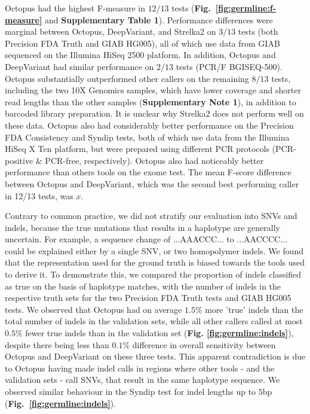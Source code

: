 \documentclass[notitlepage, twocolumn, 10pt]{article}
\begin{document}
Octopus had the highest F-measure in $12/13$ tests (\textbf{Fig.\ \ref{fig:germline:f-measure}} and \textbf{Supplementary Table 1}). Performance differences were marginal between Octopus, DeepVariant, and Strelka2 on $3/13$ tests (both Precision FDA Truth and GIAB HG005), all of which use data from GIAB sequenced on the Illumina HiSeq 2500 platform. In addition, Octopus and DeepVariant had similar performance on $2/13$ tests (PCR/F BGISEQ-500). Octopus substantially outperformed other callers on the remaining $8/13$ tests, including the two 10X Genomics samples, which have lower coverage and shorter read lengths than the other samples (\textbf{Supplementary Note 1}), in addition to barcoded library preparation. It is unclear why Strelka2 does not perform well on these data. Octopus also had considerably better performance on the Precision FDA Consistency and Syndip tests, both of which use data from the Illumina HiSeq X Ten platform, but were prepared using different PCR protocols (PCR-positive \& PCR-free, respectively). Octopus also had noticeably better performance than others tools on the exome test. The mean F-score difference between Octopus and DeepVariant, which was the second best performing caller in 12/13 tests, was $x$.

Contrary to common practice, we did not stratify our evaluation into SNVs and indels, because the true mutations that results in a haplotype are generally uncertain.
For example, a sequence change of ...AAACCC... to ...AACCCC... could be explained either by a single SNV, or two homopolymer indels.
We found that the representation used for the ground truth is biased towards the tools used to derive it. To demonstrate this, we compared the proportion of indels classified as true on the basis of haplotype matches, with the number of indels in the respective truth sets for the two Precision FDA Truth tests and GIAB HG005 tests. We observed that Octopus had on average $1.5\%$ more 'true' indels than the total number of indels in the validation sets, while all other callers called at most $0.5\%$ fewer true indels than in the validation set (\textbf{Fig. \ref{fig:germline:indels}}), despite there being less than $0.1\%$ difference in overall sensitivity between Octopus and DeepVariant on these three tests. This apparent contradiction is due to Octopus having made indel calls in regions where other tools - and the validation sets - call SNVs, that result in the same haplotype sequence. We observed similar behaviour in the Syndip test for indel lengths up to $5$bp (\textbf{Fig.\ \ref{fig:germline:indels}}).
\end{document}
